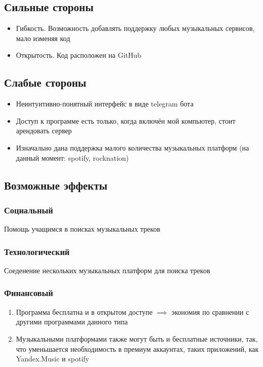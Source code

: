 \subsection{Сильные стороны}

\begin{itemize}
\item Гибкость.  Возможность добавлять поддержку любых музыкальных сервисов, мало изменяя код
\item Открытость.  Код расположен на GitHub
\end{itemize}

\subsection{Слабые стороны}

\begin{itemize}
\item Неинтуитивно-понятный интерфейс в виде telegram бота
\item
  Доступ к программе есть только, когда включён мой компьютер, стоит арендовать сервер
\item
  Изначально дана поддержка малого количества музыкальных платформ  (на данный момент: spotify, rocknation)
\end{itemize}

\subsection{Возможные эффекты}

\subsubsection{Социальный}
Помощь учащимся в поисках музыкальных треков

\subsubsection{Технологический}
Соеденение нескольких музыкальных платформ для поиска треков

\subsubsection{Финансовый}

\begin{enumerate}
\item
  Программа бесплатна и в открытом доступе \(\implies\) экономия по
  сравнении с другими программами данного типа

\item
  Музыкальными платформами также могут быть и бесплатные источники, так, что уменьшается необходимость в премиум аккаунтах, таких приложений, как Yandex.Music и spotify
\end{enumerate}

